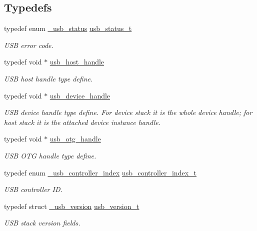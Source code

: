 \subsection*{Typedefs}
\begin{DoxyCompactItemize}
\item 
typedef enum \hyperlink{group__usb__drv_ga31d8e2352453c297062fe03df5193b22}{\-\_\-usb\-\_\-status} \hyperlink{group__usb__drv_ga3172b9f50553fb6d8aa2823d10a39c58}{usb\-\_\-status\-\_\-t}
\begin{DoxyCompactList}\small\item\em U\-S\-B error code. \end{DoxyCompactList}\item 
typedef void $\ast$ \hyperlink{group__usb__drv_ga54bc454c4d89ebc62bcdf09f5bdf688e}{usb\-\_\-host\-\_\-handle}
\begin{DoxyCompactList}\small\item\em U\-S\-B host handle type define. \end{DoxyCompactList}\item 
typedef void $\ast$ \hyperlink{group__usb__drv_gae62132dc6e5eba994f8aa56cb7399abc}{usb\-\_\-device\-\_\-handle}
\begin{DoxyCompactList}\small\item\em U\-S\-B device handle type define. For device stack it is the whole device handle; for host stack it is the attached device instance handle. \end{DoxyCompactList}\item 
typedef void $\ast$ \hyperlink{group__usb__drv_ga7d25adf2128a3eba7b847eea081de6fe}{usb\-\_\-otg\-\_\-handle}
\begin{DoxyCompactList}\small\item\em U\-S\-B O\-T\-G handle type define. \end{DoxyCompactList}\item 
typedef enum \hyperlink{group__usb__drv_gabbaaa0009bbf8797e30a739960f3fd58}{\-\_\-usb\-\_\-controller\-\_\-index} \hyperlink{group__usb__drv_ga7050376bd615bfc9027ac2ab0fd853f3}{usb\-\_\-controller\-\_\-index\-\_\-t}
\begin{DoxyCompactList}\small\item\em U\-S\-B controller I\-D. \end{DoxyCompactList}\item 
typedef struct \hyperlink{struct__usb__version}{\-\_\-usb\-\_\-version} \hyperlink{group__usb__drv_ga05687927bd26979d4ccb85a4aa049d5a}{usb\-\_\-version\-\_\-t}
\begin{DoxyCompactList}\small\item\em U\-S\-B stack version fields. \end{DoxyCompactList}\end{DoxyCompactItemize}

